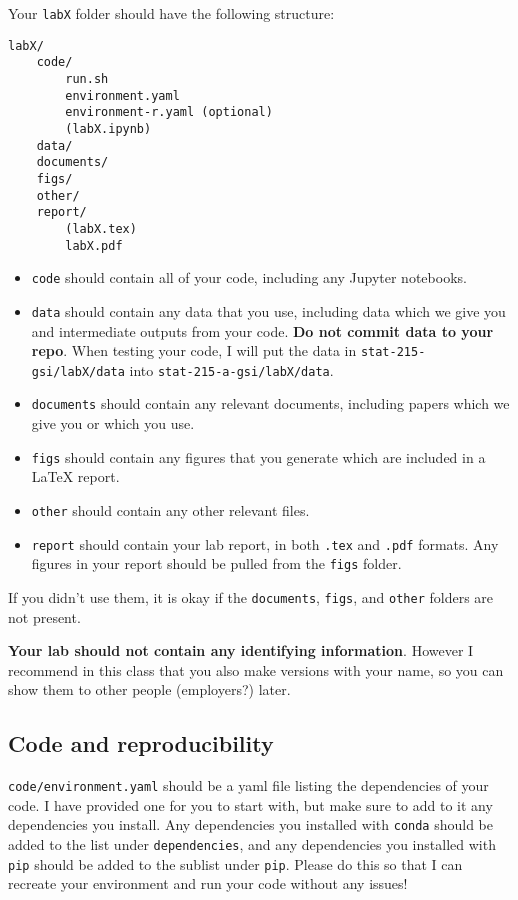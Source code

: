\documentclass[letterpaper,12pt]{article}
\begin{document}
Your \texttt{labX} folder should have the following structure:
\begin{verbatim}
labX/
    code/
        run.sh
        environment.yaml
        environment-r.yaml (optional)
        (labX.ipynb)
    data/
    documents/
    figs/
    other/
    report/
        (labX.tex)
        labX.pdf
\end{verbatim}
\begin{itemize}
    \item \texttt{code} should contain all of your code, including any Jupyter notebooks.
    \item  \texttt{data} should contain any data that you use, including data which we give you and intermediate outputs from your code. \textbf{Do not commit data to your repo}. When testing your code, I will put the data in \texttt{stat-215-gsi/labX/data} into \texttt{stat-215-a-gsi/labX/data}.
    \item \texttt{documents} should contain any relevant documents, including papers which we give you or which you use.
    \item \texttt{figs} should contain any figures that you generate which are included in a LaTeX report.
    \item \texttt{other} should contain any other relevant files.
    \item \texttt{report} should contain your lab report, in both \texttt{.tex} and \texttt{.pdf} formats. Any figures in your report should be pulled from the \texttt{figs} folder.
\end{itemize}
If you didn't use them, it is okay if the \texttt{documents}, \texttt{figs}, and \texttt{other} folders are not present.

\textbf{Your lab should not contain any identifying information}. However I recommend in this class that you also make versions with your name, so you can show them to other people (employers?) later.

\subsection{Code and reproducibility}
\texttt{code/environment.yaml} should be a yaml file listing the dependencies of your code. I have provided one for you to start with, but make sure to add to it any dependencies you install. Any dependencies you installed with \texttt{conda} should be added to the list under \texttt{dependencies}, and any dependencies you installed with \texttt{pip} should be added to the sublist under \texttt{pip}. Please do this so that I can recreate your environment and run your code without any issues!
\end{document}
